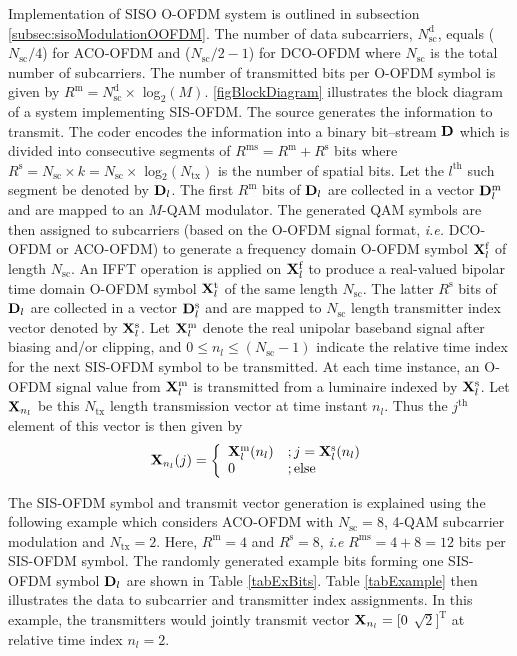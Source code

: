 Implementation of SISO O-OFDM system is outlined in subsection \ref{subsec:sisoModulationOOFDM}. The number of data subcarriers, $N_{\text{sc}}^{\text{d}}$, equals ($N_{\text{sc}}/4$) for ACO-OFDM and ($N_{\text{sc}}/2-1$) for DCO-OFDM where $N_{\text{sc}}$ is the total number of subcarriers. The number of transmitted bits per O-OFDM symbol is given by $R^{\text{m}}=N_{\text{sc}}^{\text{d}}\times $ log$^{ }_{2}(M)$. \figurename{ \ref{figBlockDiagram}} illustrates the block diagram of a system implementing SIS-OFDM. The source generates the information to transmit. The coder encodes the information into a binary bit--stream ${\bf{D}}$ which is divided into consecutive segments of $R^{\text{ms}}=R^{\text{m}}+R^{\text{s}}$ bits where $R^{\text{s}}=N_{\text{sc}}\times k=N_{\text{sc}}\times $ log$^{ }_{2}(N_{\text{tx}})$ is the number of spatial bits. Let the $l^{\text{th}}$ such segment be denoted by ${\bf{D}}_l$. The first $R^{\text{m}}$ bits of ${\bf{D}}_l$ are collected in a vector ${\bf{D}}_l^{\text{m}}$ and are mapped to an $M$-QAM modulator. The generated QAM symbols are then assigned to subcarriers (based on the O-OFDM signal format, \textit{i.e.} DCO-OFDM or ACO-OFDM) to generate a frequency domain O-OFDM symbol ${\bf{X}}_l^{\text{f}}$ of length $N_{\text{sc}}$. An IFFT operation is applied on ${\bf{X}}_l^{\text{f}}$ to produce a real-valued bipolar time domain O-OFDM symbol ${\bf{X}}_l^{\text{t}}$ of the same length $N_{\text{sc}}$. The latter $R^{\text{s}}$ bits of ${\bf{D}}_l$ are collected in a vector ${\bf{D}}_{l}^{\text{s}}$ and are mapped to $N_{\text{sc}}$ length transmitter index vector denoted by ${\bf{X}}_l^{\text{s}}$. Let ${\bf{X}}_l^{\text{m}}$ denote the real unipolar baseband signal after biasing and/or clipping, and $0\leq n_l\leq (N_{\text{sc}}-1)$ indicate the relative time index for the next SIS-OFDM symbol to be transmitted. At each time instance, an O-OFDM signal value from ${\bf{X}}_l^{\text{m}}$ is transmitted from a luminaire indexed by ${\bf{X}}_l^{\text{s}}$. Let ${\bf{X}}_{n_l}$ be this $N_{\text{tx}}$ length transmission vector at time instant $n_l$. Thus the $j^{\text{th}}$ element of this vector is then given by
\begin{equation}
	\label{eqX}
	{\bf{X}}_{n_l}(j) = \left\{ \begin{array}{ll} {\bf{X}}_l^{\text{m}}(n_l) &; j={\bf{X}}_l^{\text{s}}(n_l) \\ 0 &; \text{else} \end{array} \right.
\end{equation}

The SIS-OFDM symbol and transmit vector generation is explained using the following example which considers ACO-OFDM with $N_{\text{sc}}=8$, 4-QAM subcarrier modulation and $N_{\text{tx}}=2$. Here, $R^{\text{m}}=4$ and $R^{\text{s}}=8$, \textit{i.e} $R^{\text{ms}}=4+8=12$ bits per SIS-OFDM symbol. The randomly generated example bits forming one SIS-OFDM symbol ${\bf{D}}_l$ are shown in Table \ref{tabExBits}. Table \ref{tabExample} then illustrates the data to subcarrier and transmitter index assignments. In this example, the transmitters would jointly transmit vector ${\bf{X}}_{n_l}=[0$ $\sqrt{2}]^{\text{T}}$ at relative time index $n_l=2$.

